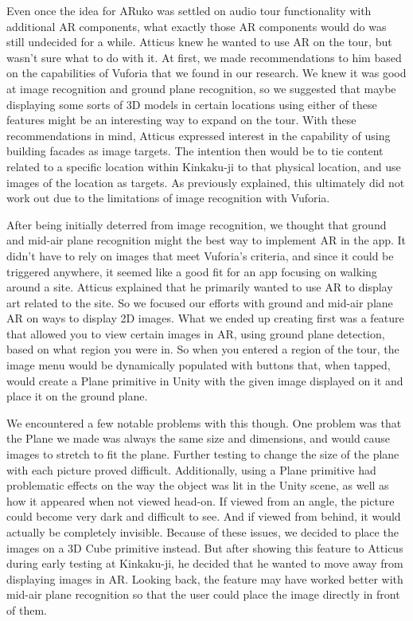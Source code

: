 \documentclass[a4paper, 10pt, american, titlepage]{article}
\begin{document}
Even once the idea for ARuko was settled on audio tour functionality with 
additional AR components, what exactly those AR components would do was still
undecided for a while. Atticus knew he wanted to use AR on the tour, but wasn't
sure what to do with it. At first, we made recommendations to him based on the
capabilities of Vuforia that we found in our research. We knew it was good at
image recognition and ground plane recognition, so we suggested that maybe 
displaying some sorts of 3D models in certain locations using either of these
features might be an interesting way to expand on the tour. With these 
recommendations in mind, Atticus expressed interest in the capability of using
building facades as image targets. The intention then would be to tie content
related to a specific location within Kinkaku-ji to that physical location, and
use images of the location as targets. As previously explained, this ultimately
did not work out due to the limitations of image recognition with Vuforia. 

After being initially deterred from image recognition, we thought that ground
and mid-air plane recognition might the best way to implement AR in the app. 
It didn't have to rely on images that meet Vuforia's criteria, and since it 
could be triggered anywhere, it seemed like a good fit for an app focusing on
walking around a site. Atticus explained that he primarily wanted to use AR to
display art related to the site. So we focused our efforts with ground and 
mid-air plane AR on ways to display 2D images. What we ended up creating first
was a feature that allowed you to view certain images in AR, using ground plane
detection, based on what region you were in. So when you entered a region of 
the tour, the image menu would be dynamically populated with buttons that, when
tapped, would create a Plane primitive in Unity with the given image displayed
on it and place it on the ground plane. 

We encountered a few notable problems with this though. One problem was that 
the Plane we made was always the same size and dimensions, and would cause 
images to stretch to fit the plane. Further testing to change the size of the
plane with each picture proved difficult. Additionally, using a Plane primitive
had problematic effects on the way the object was lit in the Unity scene, as 
well as how it appeared when not viewed head-on. If viewed from an angle, the 
picture could become very dark and difficult to see. And if viewed from behind,
it would actually be completely invisible. Because of these issues, we decided
to place the images on a 3D Cube primitive instead. But after showing this
feature to Atticus during early testing at Kinkaku-ji, he decided that he 
wanted to move away from displaying images in AR. Looking back, the feature
may have worked better with mid-air plane recognition so that the user could
place the image directly in front of them. 
\end{document}
